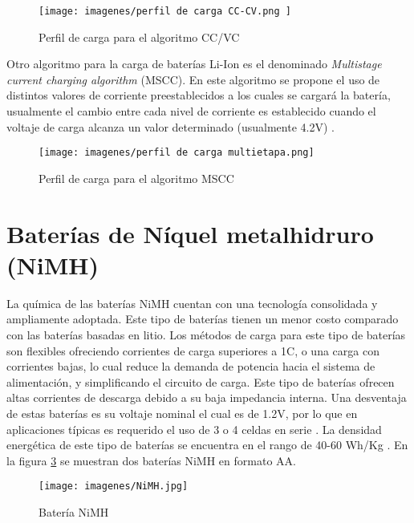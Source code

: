 \begin{figure}[H]
   \centering
   \texttt{[image: imagenes/perfil de carga CC-CV.png ]}
   \caption{Perfil de carga para el algoritmo CC/VC \cite{shen_charging_2012} }
   \label{fig:cccv}
\end{figure}


Otro algoritmo para la carga de baterías Li-Ion es el denominado \textit{Multistage current charging algorithm} (MSCC). En este
algoritmo se propone el uso de distintos valores de corriente preestablecidos  a los cuales se cargará la batería,
usualmente el cambio entre cada nivel de corriente es establecido cuando el voltaje de carga alcanza un valor determinado
(usualmente 4.2V) \cite{shen_charging_2012}. 


\begin{figure}[H]
   \centering
   \texttt{[image: imagenes/perfil de carga multietapa.png]}
   \caption{Perfil de carga para el algoritmo MSCC \cite{shen_charging_2012}}
   \label{fig:MSCC}
\end{figure}


\section{Baterías de Níquel metalhidruro (NiMH)}

La química de las baterías NiMH cuentan con una tecnología consolidada y ampliamente adoptada. Este tipo de baterías
tienen un menor costo comparado con las baterías basadas en litio. Los métodos de carga para este tipo de baterías son
flexibles ofreciendo corrientes de carga superiores a 1C, o una carga con corrientes bajas, lo cual reduce la demanda
de potencia hacia el sistema de alimentación, y simplificando el circuito de carga. Este tipo de baterías ofrecen altas
corrientes de descarga debido a su baja impedancia interna. Una desventaja de estas baterías es su voltaje nominal 
el cual es de 1.2V, por lo que en aplicaciones típicas es requerido el uso de 3 o 4 celdas en serie
 \cite{texas_instrumens_multi-chemistry_2022}. La densidad energética de este tipo de baterías se encuentra en el 
 rango de 40-60 Wh/Kg \cite{zhan_characteristics_1999}. En la figura \ref{fig:NiMH} se muestran dos baterías NiMH
 en formato AA.

\begin{figure} [H]
   \centering
   \texttt{[image: imagenes/NiMH.jpg]}
   \caption{Batería NiMH \cite{multicherry_english_2020}}
   \label{fig:NiMH}
\end{figure}


